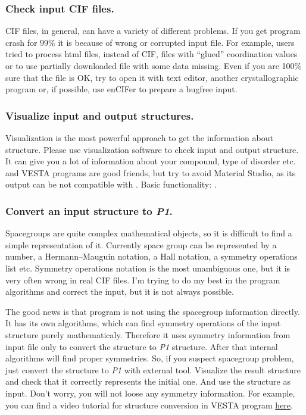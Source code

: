 \documentclass[a4paper,10pt]{article}
\begin{document}
\subsubsection{Check input CIF files.}
CIF files, in general, can have a variety of different problems. If you get \sups{} program crash for $99\%$ it is because of wrong or corrupted input file. For example, \sups{} users tried to process html files, instead of CIF, files with ``glued'' coordination values or to use partially downloaded file with some data missing. Even if you are 100\% sure that the file is OK, try to open it with text editor, another crystallographic program or, if possible, use enCIFer to prepare a bugfree input.

\subsubsection{Visualize input and output structures.}
Visualization is the most powerful approach to get the information about structure. Please use visualization software to check input and output structure. It can give you a lot of information about your compound, type of disorder etc. \Sups{} and VESTA programs are good friends, but try to avoid Material Studio, as its output can be not compatible with \sups{}.
Basic functionality: .
\subsubsection{Convert an input structure to \textit{P1}. }
Spacegroups are quite complex mathematical objects, so it is difficult to find a simple representation of it. Currently space group can be represented by a number, a Hermann–Mauguin notation, a Hall notation, a symmetry operations list etc. Symmetry operations notation is the most unambiguous one, but it is very often wrong in real CIF files. I'm trying to do my best in the program algorithms and correct the input, but it is not always possible.

The good news is that \sups{} program is not using the spacegroup information directly. It has its own algorithms, which can find symmetry operations of the input structure purely mathematicaly. Therefore it uses symmetry information from input file only to convert the structure to \textit{P1} structure. After that internal algorithms will find proper symmetries. So, if you suspect spacegroup problem, just convert the structure to \textit{P1} with external tool. Visualize the result structure and check that it correctly represents the initial one. And use the structure as \sups{} input. Don't worry, you will not loose any symmetry information. For example, you can find a video tutorial for structure conversion in VESTA program \href{https://www.youtube.com/watch?v=LCdb6LrD24E}{here}.
\end{document}
